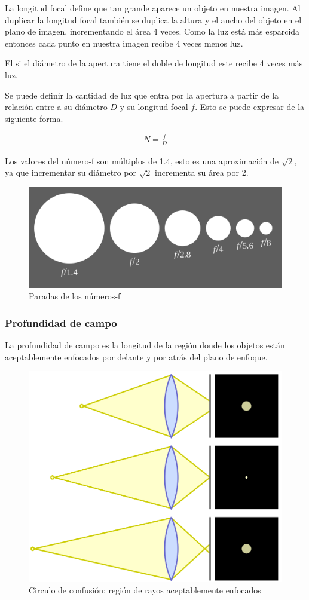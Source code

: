 \documentclass{article}
\begin{document}
La longitud focal define que tan grande aparece un objeto en nuestra imagen. Al duplicar la longitud focal también se duplica la altura y el ancho del objeto en el plano de imagen, incrementando el área 4 veces. Como la luz está más esparcida entonces cada punto en nuestra imagen recibe 4 veces menos luz.

El si el diámetro de la apertura tiene el doble de longitud este recibe 4 veces más luz.

Se puede definir la cantidad de luz que entra por la apertura a partir de la relación entre a su diámetro $D$ y su longitud focal $f$. Esto se puede expresar de la siguiente forma.

\begin{align*}
	N = \frac{f}{D}
\end{align*}

Los valores del número-f son múltiplos de 1.4, esto es una aproximación de $\sqrt{2}$, ya que incrementar su diámetro por $\sqrt{2}$ incrementa su área por 2.

\begin{figure}[H]
	\centering
	\includegraphics[width=0.75\linewidth]{Figuras/F-number}
	\caption{Paradas de los números-f}
	\label{fig:f-number}
\end{figure}


\subsubsection{Profundidad de campo}

La profundidad de campo es la longitud de la región donde los objetos están aceptablemente enfocados por delante y por atrás del plano de enfoque.

\begin{figure}[H]
	\centering
	\includegraphics[width=0.60\linewidth]{Figuras/Circle_of_confusion}
	\caption{Circulo de confusión: región de rayos aceptablemente enfocados}
	\label{fig:circleofconfusion}
\end{figure}
\end{document}
